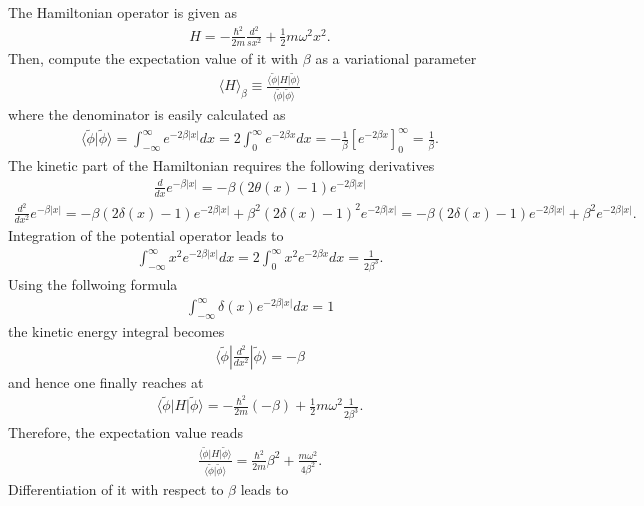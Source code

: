 \documentclass{jlreq}
\begin{document}
The Hamiltonian operator is given as
\begin{align}
    H=-\frac{\hbar^2}{2m}\frac{d^2}{sx^2}+\frac{1}{2}m\omega^2x^2.
\end{align}
Then, compute the expectation value of it with $\beta$ as a variational parameter
\begin{align}
    \langle H\rangle_\beta\equiv\frac{\langle\tilde{\phi}|H|\tilde{\phi}\rangle}{\langle\tilde{\phi}|\tilde{\phi}\rangle}
\end{align}
where the denominator is easily calculated as
\begin{align}
    \langle\tilde{\phi}|\tilde{\phi}\rangle=\int^\infty_{-\infty}e^{-2\beta|x|} dx=2\int^\infty_{0}e^{-2\beta x} dx = -\frac{1}{\beta}[e^{-2\beta x}]^\infty_0=\frac{1}{\beta}.
\end{align}
The kinetic part of the Hamiltonian requires the following derivatives
\begin{align}
    \frac{d}{dx}e^{-\beta |x|}=-\beta (2\theta(x)-1)e^{-2\beta |x|}
\end{align}
\begin{align}
    \frac{d^2}{dx^2}e^{-\beta |x|}=-\beta (2\delta(x)-1)e^{-2\beta |x|}+\beta^2 (2\delta(x)-1)^2 e^{-2\beta |x|}=-\beta (2\delta(x)-1)e^{-2\beta |x|}+\beta^2 e^{-2\beta |x|}.
\end{align}
Integration of the potential operator leads to
\begin{align}
    \int^\infty_{-\infty} x^2 e^{-2\beta|x|}dx=2\int^{\infty}_0 x^2 e^{-2\beta x}dx=\frac{1}{2\beta^3}.
\end{align}
Using the follwoing formula
\begin{align}
    \int^\infty_{-\infty} \delta(x) e^{-2\beta|x|}dx=1
\end{align}
the kinetic energy integral becomes
\begin{align}
    \langle\tilde{\phi}|\frac{d^2}{dx^2}|\tilde{\phi}\rangle=-\beta
\end{align}
and hence one finally reaches at
\begin{align}
    \langle\tilde{\phi}|H|\tilde{\phi}\rangle=-\frac{\hbar^2}{2m}(-\beta)+\frac{1}{2}m\omega^2\frac{1}{2\beta^3}.
\end{align}
Therefore, the expectation value reads
\begin{align}
    \frac{\langle\tilde{\phi}|H|\tilde{\phi}\rangle}{\langle\tilde{\phi}|\tilde{\phi}\rangle}=\frac{\hbar^2}{2m}\beta^2+\frac{m\omega^2}{4\beta^2}.
\end{align}
Differentiation of it with respect to $\beta$ leads to
\end{document}
